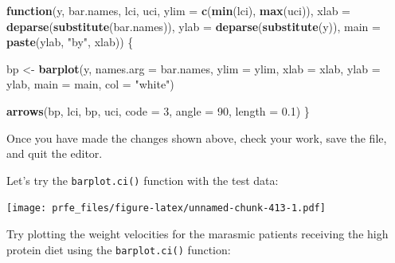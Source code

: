 \documentclass[12pt,a4paper]{book}
\newenvironment{Shaded}{\begin{snugshade}}{\end{snugshade}}
\newcommand{\KeywordTok}[1]{\textcolor[rgb]{0.13,0.29,0.53}{\textbf{#1}}}
\newcommand{\DataTypeTok}[1]{\textcolor[rgb]{0.13,0.29,0.53}{#1}}
\newcommand{\DecValTok}[1]{\textcolor[rgb]{0.00,0.00,0.81}{#1}}
\newcommand{\FloatTok}[1]{\textcolor[rgb]{0.00,0.00,0.81}{#1}}
\newcommand{\StringTok}[1]{\textcolor[rgb]{0.31,0.60,0.02}{#1}}
\newcommand{\ControlFlowTok}[1]{\textcolor[rgb]{0.13,0.29,0.53}{\textbf{#1}}}
\newcommand{\OperatorTok}[1]{\textcolor[rgb]{0.81,0.36,0.00}{\textbf{#1}}}
\newcommand{\NormalTok}[1]{#1}
\theoremstyle{definition}
\theoremstyle{definition}
\theoremstyle{definition}
\theoremstyle{remark}
\begin{document}
\begin{Shaded}
\begin{Highlighting}[]
\ControlFlowTok{function}\NormalTok{(y, bar.names, lci, uci,}
         \DataTypeTok{ylim =} \KeywordTok{c}\NormalTok{(}\KeywordTok{min}\NormalTok{(lci), }\KeywordTok{max}\NormalTok{(uci)),}
         \DataTypeTok{xlab =} \KeywordTok{deparse}\NormalTok{(}\KeywordTok{substitute}\NormalTok{(bar.names)),}
         \DataTypeTok{ylab =} \KeywordTok{deparse}\NormalTok{(}\KeywordTok{substitute}\NormalTok{(y)),}
         \DataTypeTok{main =} \KeywordTok{paste}\NormalTok{(ylab, }\StringTok{"by"}\NormalTok{, xlab)) \{}
     
\NormalTok{  bp <-}\StringTok{ }\KeywordTok{barplot}\NormalTok{(y, }\DataTypeTok{names.arg =}\NormalTok{ bar.names, }\DataTypeTok{ylim =}\NormalTok{ ylim, }\DataTypeTok{xlab =}\NormalTok{ xlab,}
                \DataTypeTok{ylab =}\NormalTok{ ylab, }\DataTypeTok{main =}\NormalTok{ main, }\DataTypeTok{col =} \StringTok{"white"}\NormalTok{)}
     
  \KeywordTok{arrows}\NormalTok{(bp, lci, bp, uci, }\DataTypeTok{code =} \DecValTok{3}\NormalTok{, }\DataTypeTok{angle =} \DecValTok{90}\NormalTok{, }\DataTypeTok{length =} \FloatTok{0.1}\NormalTok{)}
\NormalTok{\}}
\end{Highlighting}
\end{Shaded}

Once you have made the changes shown above, check your work, save the
file, and quit the editor.

Let's try the \texttt{barplot.ci()} function with the test data:

\begin{Shaded}
\end{Shaded}

\texttt{[image: prfe\_files/figure-latex/unnamed-chunk-413-1.pdf]}

Try plotting the weight velocities for the marasmic patients receiving
the high protein diet using the \texttt{barplot.ci()} function:

\begin{Shaded}
\end{Shaded}
\end{document}
